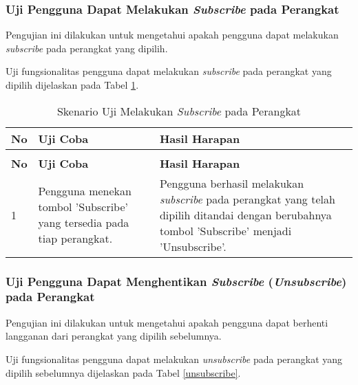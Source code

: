 \subsubsection{Uji Pengguna Dapat Melakukan \textit{Subscribe} pada Perangkat} \label{kelima}
Pengujian ini dilakukan untuk mengetahui apakah pengguna dapat melakukan \textit{subscribe} pada perangkat yang dipilih. 

Uji fungsionalitas pengguna dapat melakukan \textit{subscribe} pada perangkat yang dipilih dijelaskan pada Tabel \ref{subscribe}.

\begin{longtable}{|p{}|p{}|p{}|}					\caption{Skenario Uji Pengguna Dapat Melakukan \textit{Subscribe} pada Perangkat} \label{subscribe} \\
	\hline
	\textbf{No} & \textbf{Uji Coba} & \textbf{Hasil Harapan} \\ \hline
	\endfirsthead
	\caption[]{Skenario Uji Melakukan \textit{Subscribe} pada Perangkat} \\
	\hline
	\textbf{No} & \textbf{Uji Coba} & \textbf{Hasil Harapan} \\ \hline
	\endhead
	\endfoot
	\endlastfoot
	
	1 & Pengguna menekan tombol 'Subscribe' yang tersedia pada tiap perangkat. & Pengguna berhasil melakukan \textit{subscribe} pada perangkat yang telah dipilih ditandai dengan berubahnya tombol 'Subscribe' menjadi 'Unsubscribe'.\\ \hline
\end{longtable}

\subsubsection{Uji Pengguna Dapat Menghentikan \textit{Subscribe} (\textit{Unsubscribe}) pada Perangkat} \label{keenam}
Pengujian ini dilakukan untuk mengetahui apakah pengguna dapat berhenti langganan dari perangkat yang dipilih sebelumnya. 

Uji fungsionalitas pengguna dapat melakukan \textit{unsubscribe} pada perangkat yang dipilih sebelumnya dijelaskan pada Tabel \ref{unsubscribe}.

